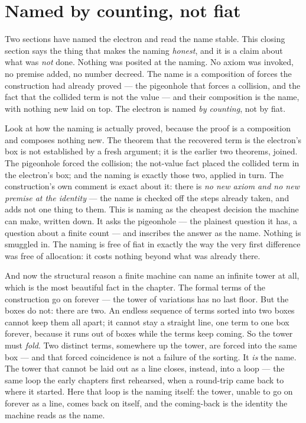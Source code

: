 \section{Named by counting, not fiat}

Two sections have named the electron and read the name stable. This closing section says the thing that makes the
naming \emph{honest}, and it is a claim about what was \emph{not} done. Nothing was posited at the naming. No axiom was
invoked, no premise added, no number decreed. The name is a composition of forces the construction had already proved
--- the pigeonhole that forces a collision, and the fact that the collided term is not the value --- and their
composition is the name, with nothing new laid on top. The electron is named \emph{by counting}, not by fiat.

Look at how the naming is actually proved, because the proof is a composition and composes nothing new. The theorem
that the recovered term is the electron's box is not established by a fresh argument; it is the earlier two theorems,
joined. The pigeonhole forced the collision; the not-value fact placed the collided term in the electron's box; and the
naming is exactly those two, applied in turn. The construction's own comment is exact about it: there is \emph{no new
axiom and no new premise at the identity} --- the name is checked off the steps already taken, and adds not one thing
to them. This is naming as the cheapest decision the machine can make, written down. It asks the pigeonhole --- the
plainest question it has, a question about a finite count --- and inscribes the answer as the name. Nothing is smuggled
in. The naming is free of fiat in exactly the way the very first difference was free of allocation: it costs nothing
beyond what was already there.

And now the structural reason a finite machine can name an infinite tower at all, which is the most beautiful fact in
the chapter. The formal terms of the construction go on forever --- the tower of variations has no last floor. But the
boxes do not: there are two. An endless sequence of terms sorted into two boxes cannot keep them all apart; it cannot
stay a straight line, one term to one box forever, because it runs out of boxes while the terms keep coming. So the
tower must \emph{fold}. Two distinct terms, somewhere up the tower, are forced into the same box --- and that forced
coincidence is not a failure of the sorting. It \emph{is} the name. The tower that cannot be laid out as a line closes,
instead, into a loop --- the same loop the early chapters first rehearsed, when a round-trip came back to where it
started. Here that loop is the naming itself: the tower, unable to go on forever as a line, comes back on itself, and
the coming-back is the identity the machine reads as the name.

